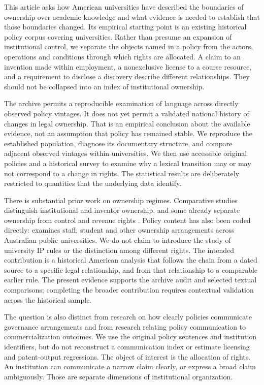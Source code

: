 \documentclass[12pt]{article}
\begin{document}
This article asks how American universities have described the boundaries of ownership over academic knowledge and what evidence is needed to establish that those boundaries changed. Its empirical starting point is an existing historical policy corpus covering \Universities{} universities. Rather than presume an expansion of institutional control, we separate the objects named in a policy from the actors, operations and conditions through which rights are allocated. A claim to an invention made within employment, a nonexclusive license to a course resource, and a requirement to disclose a discovery describe different relationships. They should not be collapsed into an index of institutional ownership.

The archive permits a reproducible examination of language across directly observed policy vintages. It does not yet permit a validated national history of changes in legal ownership. That is an empirical conclusion about the available evidence, not an assumption that policy has remained stable. We reproduce the established population, diagnose its documentary structure, and compare adjacent observed vintages within universities. We then use accessible original policies and a historical survey to examine why a lexical transition may or may not correspond to a change in rights. The statistical results are deliberately restricted to quantities that the underlying data identify.

There is substantial prior work on ownership regimes. Comparative studies distinguish institutional and inventor ownership, and some already separate ownership from control and revenue rights \citep{kenney2011,halilem2017}. Policy content has also been coded directly: \citet{jamali2024} examines staff, student and other ownership arrangements across Australian public universities. We do not claim to introduce the study of university IP rules or the distinction among different rights. The intended contribution is a historical American analysis that follows the chain from a dated source to a specific legal relationship, and from that relationship to a comparable earlier rule. The present evidence supports the archive audit and selected textual comparisons; completing the broader contribution requires contextual validation across the historical sample.

The question is also distinct from research on how clearly policies communicate governance arrangements and from research relating policy communication to commercialization outcomes. We use the original policy sentences and institution identifiers, but do not reconstruct a communication index or estimate licensing and patent-output regressions. The object of interest is the allocation of rights. An institution can communicate a narrow claim clearly, or express a broad claim ambiguously. Those are separate dimensions of institutional organization.
\end{document}
